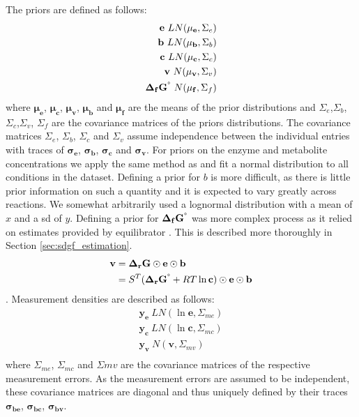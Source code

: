 \documentclass[10pt,letterpaper]{article}
\newcommand{\sdgf}{\Delta_fG^{\degree}}
\newcommand{\dgr}{\Delta_rG}
\newcommand{\sdgr}{\Delta_rG^{\degree}}
\newcommand{\bsdgf}{\mathbf{\sdgf}}
\newcommand{\bdgr}{\mathbf{\dgr}}
\newcommand{\bsdgr}{\mathbf{\sdgr}}
\newcommand{\be}{\mathbf{e}}
\newcommand{\bc}{\mathbf{c}}
\newcommand{\bb}{\mathbf{b}}
\newcommand{\bv}{\mathbf{v}}
\begin{document}
The priors are defined as follows:
\begin{align*}
    \be ~ LN(\mathbf{\mu_e}, \Sigma_e) \\
    \bb ~ LN(\mathbf{\mu_b}, \Sigma_b) \\
    \bc ~ LN(\mathbf{\mu_c}, \Sigma_c) \\
    \bv ~ N(\mathbf{\mu_v}, \Sigma_v) \\
    \bsdgf ~ N(\mathbf{\mu_{f}}, \Sigma_{f}) \\
\end{align*}
where $\mathbf{\mu_e}$, $\mathbf{\mu_c}$, $\mathbf{\mu_v}$, $\mathbf{\mu_b}$ and $\mathbf{\mu_f}$ are the means of the prior distributions and $\Sigma_e$,$\Sigma_b$, $\Sigma_c$,$\Sigma_v$, $\Sigma_f$ are the covariance matrices of the priors distributions.
The covariance matrices $\Sigma_e$, $\Sigma_b$, $\Sigma_c$ and $\Sigma_v$ assume independence between the individual entries with traces of $\mathbf{\sigma_e}$, $\mathbf{\sigma_b}$, $\mathbf{\sigma_c}$ and $\mathbf{\sigma_v}$.
For priors on the enzyme and metabolite concentrations we apply the same method as \cite{PTA} and fit a normal distribution to all conditions in the dataset. %
Defining a prior for $b$ is more difficult, as there is little prior information on such a quantity and it is expected to vary greatly across reactions.
We somewhat arbitrarily used a lognormal distribution with a mean of $x$ and a sd of $y$. %
Defining a prior for $\bsdgf$ was more complex process as it relied on estimates provided by equilibrator \cite{noor_2013_equilibrator}.
This is described more thoroughly in Section \ref{sec:sdgf_estimation}.
\begin{align}
    \bv &= \bdgr \odot \be \odot \bb \\
        &= S^T (\bsdgr + RT\ln{\bc}) \odot \be \odot \bb \\
\end{align}
.
Measurement densities are described as follows:
\begin{align*}
    \mathbf{y_{e}} ~ LN(\ln{\be}, \Sigma_{me}) \\
    \mathbf{y_{c}} ~ LN(\ln{\bc}, \Sigma_{mc}) \\
    \mathbf{y_{v}} ~ N(\bv, \Sigma_{mv}) \\
\end{align*}
where $\Sigma_{me}$, $\Sigma_{mc}$ and $\Sigma{mv}$ are the covariance matrices of the respective measurement errors.
As the measurement errors are assumed to be independent, these covariance matrices are diagonal and thus uniquely defined by their traces $\mathbf{\sigma_{be}}$, $\mathbf{\sigma_{bc}}$, $\mathbf{\sigma_{bv}}$.
\end{document}
